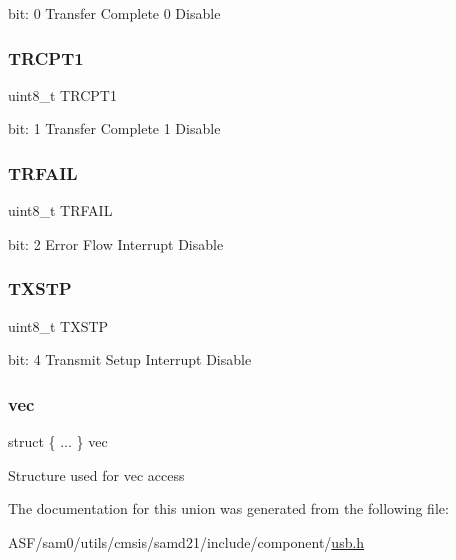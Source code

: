 bit\+: 0 Transfer Complete 0 Disable \mbox{\label{union_u_s_b___h_o_s_t___p_i_n_t_e_n_c_l_r___type_abfd778fdb9c052b995d0dabc9e75081b}} 
\subsubsection{\texorpdfstring{TRCPT1}{TRCPT1}}
{\footnotesize\ttfamily uint8\+\_\+t T\+R\+C\+P\+T1}

bit\+: 1 Transfer Complete 1 Disable \mbox{\label{union_u_s_b___h_o_s_t___p_i_n_t_e_n_c_l_r___type_a07aec3336bfd9ba5afd1e3ee3272fc96}} 
\subsubsection{\texorpdfstring{TRFAIL}{TRFAIL}}
{\footnotesize\ttfamily uint8\+\_\+t T\+R\+F\+A\+IL}

bit\+: 2 Error Flow Interrupt Disable \mbox{\label{union_u_s_b___h_o_s_t___p_i_n_t_e_n_c_l_r___type_a12a45aab272091d34c3e30cf8aa046fe}} 
\subsubsection{\texorpdfstring{TXSTP}{TXSTP}}
{\footnotesize\ttfamily uint8\+\_\+t T\+X\+S\+TP}

bit\+: 4 Transmit Setup Interrupt Disable \mbox{\label{union_u_s_b___h_o_s_t___p_i_n_t_e_n_c_l_r___type_a4619dfc2fbe04343a69df85c287df990}} 
\subsubsection{\texorpdfstring{vec}{vec}}
{\footnotesize\ttfamily struct \{ ... \}   vec}

Structure used for vec access 

The documentation for this union was generated from the following file\+:\begin{DoxyCompactItemize}
\item 
A\+S\+F/sam0/utils/cmsis/samd21/include/component/\mbox{\hyperlink{component_2usb_8h}{usb.\+h}}\end{DoxyCompactItemize}
